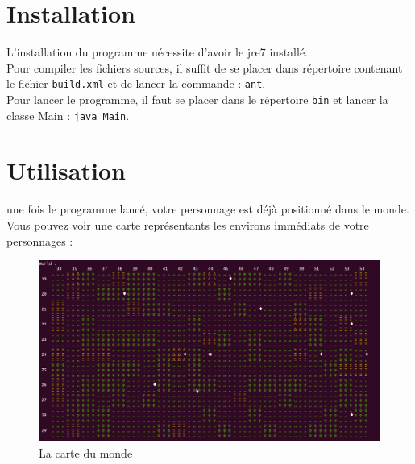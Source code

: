 \documentclass[asi]{picINSA}
\begin{document}
	
	\couverture{}

\tableofcontents{}


\chapter{Installation}

L'installation du programme nécessite d'avoir le jre7 installé. \\

Pour compiler les fichiers sources, il suffit de se placer dans répertoire contenant le fichier \verb+build.xml+ et de lancer la commande : \verb+ant+. \\ 

Pour lancer le programme, il faut se placer dans le répertoire \verb+bin+ et lancer la classe Main : \verb+java Main+.

\chapter{Utilisation}
une fois le programme lancé, votre personnage est déjà positionné dans le monde. Vous pouvez voir une carte représentants les environs immédiats de votre personnages :

\begin{figure}[!ht]
  \begin{center}
    \includegraphics[width=1\textwidth]{images/screenshootCarte01.png}
    \caption{La carte du monde}	
  \end{center}
\end{figure}
\end{document}
